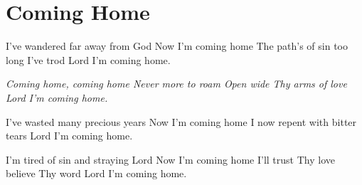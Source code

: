 \starttocol
\chapter{Coming Home}
\nexttocol
\hfill{\it }
\stoptocol
\starttocol
\startlines
{\sc I've} wandered far away from God
Now I'm coming home
The path's of sin too long I've trod
Lord I'm coming home.

{\it Coming home, coming home
Never more to roam
Open wide Thy arms of love
Lord I'm coming home.}

I've wasted many precious years
Now I'm coming home
I now repent with bitter tears
Lord I'm coming home.  

I'm tired of sin and straying Lord
Now I'm coming home
I'll trust Thy love believe Thy word
Lord I'm coming home.
\stoplines
\nexttocol

\stoptocol
